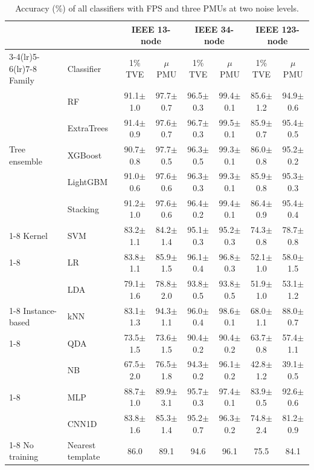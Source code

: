 \documentclass[11pt]{article}
\newenvironment{nwf}{}{}
\newcommand{\hlnew}[1]{#1}
\begin{document}
\begin{table}[!htbp]
\centering
\begin{nwf}
\caption{Accuracy (\%) of all classifiers with FPS and three PMUs at two noise levels.}\label{tab1}
\small
\setlength{\tabcolsep}{3.5pt}
\begin{tabular}{llcccccc}
\toprule
 & & \multicolumn{2}{c}{IEEE 13-node} & \multicolumn{2}{c}{IEEE 34-node} & \multicolumn{2}{c}{IEEE 123-node} \\
\cmidrule(lr){3-4}\cmidrule(lr){5-6}\cmidrule(lr){7-8}
\hlnew{Family} & Classifier & 1\% TVE & $\mu$PMU & 1\% TVE & $\mu$PMU & 1\% TVE & $\mu$PMU \\
\midrule
\multirow{5}{*}{\hlnew{Tree ensemble}} & RF & 91.1$\pm$1.0 & 97.7$\pm$0.7 & 96.5$\pm$0.3 & 99.4$\pm$0.1 & 85.6$\pm$1.2 & 94.9$\pm$0.6 \\
 & ExtraTrees & 91.4$\pm$0.9 & 97.6$\pm$0.7 & 96.7$\pm$0.3 & 99.5$\pm$0.1 & 85.9$\pm$0.7 & 95.4$\pm$0.5 \\
 & XGBoost & 90.7$\pm$0.8 & 97.7$\pm$0.5 & 96.3$\pm$0.5 & 99.3$\pm$0.1 & 86.0$\pm$0.8 & 95.2$\pm$0.2 \\
 & LightGBM & 91.0$\pm$0.6 & 97.6$\pm$0.6 & 96.3$\pm$0.3 & 99.3$\pm$0.1 & 85.9$\pm$0.8 & 95.3$\pm$0.3 \\
 & Stacking & 91.2$\pm$1.0 & 97.6$\pm$0.6 & 96.4$\pm$0.2 & 99.4$\pm$0.1 & 86.4$\pm$0.9 & 95.4$\pm$0.4 \\
\cmidrule(l){1-8}
\hlnew{Kernel} & SVM & 83.2$\pm$1.1 & 84.2$\pm$1.4 & 95.1$\pm$0.3 & 95.2$\pm$0.3 & 74.3$\pm$0.8 & 78.7$\pm$0.8 \\
\cmidrule(l){1-8}
\multirow{2}{*}{\hlnew{Linear}} & LR & 83.8$\pm$1.1 & 85.9$\pm$1.5 & 96.1$\pm$0.4 & 96.8$\pm$0.3 & 52.1$\pm$1.0 & 58.0$\pm$1.5 \\
 & LDA & 79.1$\pm$1.6 & 78.8$\pm$2.0 & 93.8$\pm$0.5 & 93.8$\pm$0.5 & 51.9$\pm$1.0 & 53.1$\pm$1.2 \\
\cmidrule(l){1-8}
\hlnew{Instance-based} & kNN & 83.1$\pm$1.3 & 94.3$\pm$1.1 & 96.0$\pm$0.4 & 98.6$\pm$0.1 & 68.0$\pm$1.1 & 88.0$\pm$0.7 \\
\cmidrule(l){1-8}
\multirow{2}{*}{\hlnew{Probabilistic}} & QDA & 73.5$\pm$1.5 & 73.6$\pm$1.5 & 90.4$\pm$0.2 & 90.4$\pm$0.2 & 63.7$\pm$0.8 & 57.4$\pm$1.1 \\
 & NB & 67.5$\pm$2.0 & 76.5$\pm$1.8 & 94.3$\pm$0.2 & 96.1$\pm$0.2 & 42.8$\pm$1.2 & 39.1$\pm$0.5 \\
\cmidrule(l){1-8}
\multirow{2}{*}{\hlnew{Neural network}} & MLP & 88.7$\pm$1.0 & 89.9$\pm$3.1 & 95.7$\pm$0.3 & 97.4$\pm$0.1 & 83.9$\pm$0.5 & 92.6$\pm$0.6 \\
 & CNN1D & 83.8$\pm$1.6 & 85.3$\pm$1.4 & 95.2$\pm$0.7 & 96.3$\pm$0.2 & 74.8$\pm$2.4 & 81.2$\pm$0.9 \\
\cmidrule(l){1-8}
\hlnew{No training} & Nearest template & 86.0 & 89.1 & 94.6 & 96.1 & 75.5 & 84.1 \\
\bottomrule
\end{tabular}
\end{nwf}
\end{table}
\end{document}
